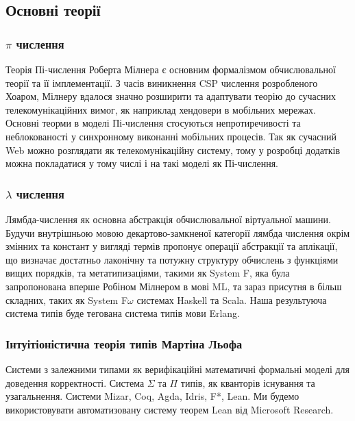 \documentclass[11pt,oneside]{article}
\begin{document}
\newpage
\subsection{Основні теорії}
\vspace{0.3cm}
   \subsubsection*{$\pi$ числення}
   Теорія Пі-числення Роберта Мілнера є основним формалізмом обчислювальної
   теорії та її імплементації. З часів виникнення CSP числення розробленого Хоаром,
   Мілнеру вдалося значно розширити та адаптувати теорію до сучасних
   телекомунікаційних вимог, як наприклад хендовери в мобільних мережах.
   Основні теорми в моделі Пі-числення стосуються непротиречивості та неблокованості
   у синхронному виконанні мобільних процесів. Так як сучасний Web можно розглядати
   як телекомунікаційну систему, тому у розробці додатків можна покладатися у тому
   числі і на такі моделі як Пі-числення.

   \subsubsection*{$\lambda$ числення}
   Лямбда-числення як основна абстракція обчислювальної віртуальної машини.
   Будучи внутрішньою мовою декартово-замкненої категорії лямбда числення окрім змінних
   та констант у вигляді термів пропонує операції абстракції та аплікації, що визначає
   достатньо лаконічну та потужну структуру обчислень з функціями вищих порядків,
   та метатипизаціями, такими як System F, яка була запропонована
   вперше Робіном Мілнером в мові ML, та зараз присутня в більш складних,
   таких як System F$\omega$ системах Haskell та Scala. Наша результуюча система
   типів буде тегована система типів мови Erlang.

   \subsubsection*{Інтуітіоністична теорія типів Мартіна Льофа}
   Системи з залежними типами як верифікаційні математичні формальні моделі
   для доведення корректності. Система $\Sigma$ та $\Pi$ типів, як кванторів
   існування та узагальнення. Системи Mizar, Coq, Agda, Idris, F*, Lean. Ми будемо
   використовувати автоматизовану систему теорем Lean від Microsoft Research.
\end{document}
